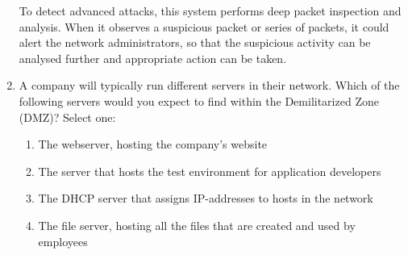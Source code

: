 \begin{enumerate}
    To detect advanced attacks, this system performs deep packet inspection and analysis. When it observes a suspicious packet or series of packets, it could alert the network administrators, so that the suspicious activity can be analysed further and appropriate action can be taken.
    \item A company will typically run different servers in their network. Which of the following servers would you expect to find within the Demilitarized Zone (DMZ)?
    Select one:
    \begin{enumerate}
        \item The webserver, hosting the company's website
        \item The server that hosts the test environment for application developers
        \item The DHCP server that assigns IP-addresses to hosts in the network
        \item The file server, hosting all the files that are created and used by employees
    \end{enumerate}
\end{enumerate}

